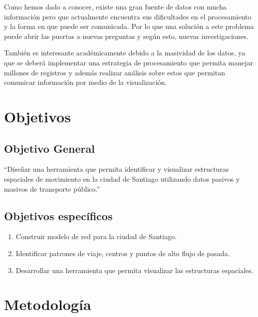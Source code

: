 \documentclass[12pt]{article}
\begin{document}
    Como hemos dado a conocer, existe una gran fuente de datos con mucha información pero que actualmente encuentra sus dificultades en el procesamiento y la forma en que puede ser comunicada. Por lo que una solución a este problema puede abrir las puertas a nuevas preguntas y según esto, nuevas investigaciones.

    También es interesante académicamente debido a la masividad de los datos, ya que se deberá implementar una estrategia de procesamiento que permita manejar millones de registros y además realizar análisis sobre estos que permitan comunicar información por medio de la visualización.

    \section{Objetivos}

    \subsection{Objetivo General}

    ``Diseñar una herramienta que permita identificar y visualizar estructuras espaciales de movimiento en la ciudad de Santiago utilizando datos pasivos y masivos de transporte público.''
    \subsection{Objetivos específicos}

    \begin{enumerate}
    \item Construir modelo de red para la ciudad de Santiago. %
    \item Identificar patrones de viaje, centros y puntos de alto flujo de pasada.
    \item Desarrollar una herramienta que permita visualizar las estructuras espaciales.
    \end{enumerate}

    \newpage
    \section{Metodología}
\end{document}
